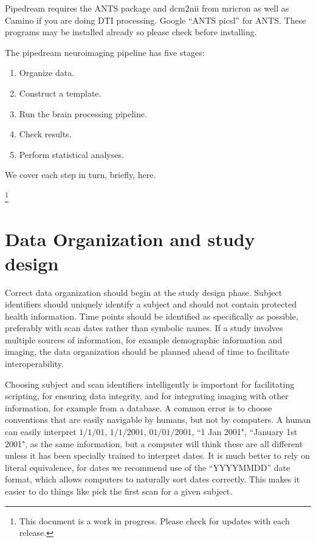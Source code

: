\documentclass{InsightArticle}
\begin{document}
Pipedream requires the ANTS package and dcm2nii from mricron as well as Camino if you are doing DTI processing.  Google ``ANTS picsl'' for ANTS.  These programs may be installed already so please check before installing.

The pipedream neuroimaging pipeline has five stages: 
\begin{enumerate}
\item Organize data.
\item Construct a template.  
\item Run the brain processing pipeline.  
\item Check results. 
\item Perform statistical analyses.  
\end{enumerate}

We cover each step in turn, briefly, here. 


\footnote{This document is a work in progress. Please check for updates with each release.}

\section{Data Organization and study design}

Correct data organization should begin at the study design phase. Subject identifiers should uniquely identify a subject and should not contain protected health information. Time points should be identified as specifically as possible, preferably with scan dates rather than symbolic names. If a study involves multiple sources of information, for example demographic information and imaging, the data organization should be planned ahead of time to facilitate interoperability.

Choosing subject and scan identifiers intelligently is important for facilitating scripting, for ensuring data integrity, and for integrating imaging with other information, for example from a database. A common error is to choose conventions that are easily navigable by humans, but not by computers. A human can easily interpret $1/1/01$, $1/1/2001$, $01/01/2001$, ``1 Jan 2001", ``January 1st 2001", as the same information, but a computer will think these are all different unless it has been specially trained to interpret dates. It is much better to rely on literal equivalence, for dates we recommend use of the ``YYYYMMDD'' date format, which allows computers to naturally sort dates correctly. This makes it easier to do things like pick the first scan for a given subject.
\end{document}
